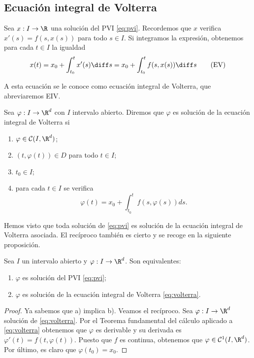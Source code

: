 \documentclass{article}
\begin{document}
\subsection{Ecuación integral de Volterra}

Sea $x: I \to \R$ una solución del PVI \eqref{eq:pvi}.  Recordemos que $x$ verifica
$x'(s) = f(s,x(s))$ para todo $s \in I$. Si integramos la expresión, obtenemos para cada $t \in I$
la igualdad
\begin{equation}
  \label{eq:volterra}
  x(t) = x_0 + \int_{t_0}^t x'(s) \diff s = x_0 + \int_{t_0}^tf(s,x(s)) \diff s
  \tag{EV}
\end{equation}

A esta ecuación se le conoce como ecuación integral de Volterra, que abreviaremos EIV.

\begin{definition}
  Sea $\varphi: I \to \R^d$ con $I$ intervalo abierto. Diremos que $\varphi$ es solución de la
  ecuación integral de Volterra si

  \begin{enumerate}
  \item $\varphi \in \mathcal{C}(I, \R^d)$;
  \item $(t, \varphi(t)) \in D$ para todo $t \in I$;
  \item $t_0 \in I$;
  \item para cada $t \in I$ se verifica
    \[\varphi(t) = x_0 + \displaystyle\int_{t_0}^t f(s, \varphi(s))ds.\]
  \end{enumerate}
\end{definition}

Hemos visto que toda solución de \eqref{eq:pvi} es solución de la ecuación integral de Volterra
asociada. El recíproco también es cierto y se recoge en la siguiente proposición.

\begin{proposition}
  Sea $I$ un intervalo abierto y $\varphi: I \to \R^d$. Son equivalentes:
  \begin{enumerate}
  \item $\varphi$ es solución del PVI \eqref{eq:pvi};
  \item $\varphi$ es solución de la ecuación integral de Volterra \eqref{eq:volterra}.
  \end{enumerate}
\end{proposition}
\begin{proof}
  Ya sabemos que a) implica b). Veamos el recíproco. Sea $\varphi: I \to \R^d$ solución de
  \eqref{eq:volterra}.  Por el Teorema fundamental del cálculo aplicado a \eqref{eq:volterra}
  obtenemos que $\varphi$ es derivable y su derivada es $\varphi'(t) = f(t, \varphi(t))$. Puesto que
  $f$ es continua, obtenemos que $\varphi \in \mathcal{C}^1(I, \R^d)$. Por último, es claro que
  $\varphi(t_0) = x_0$.
\end{proof}
\end{document}
